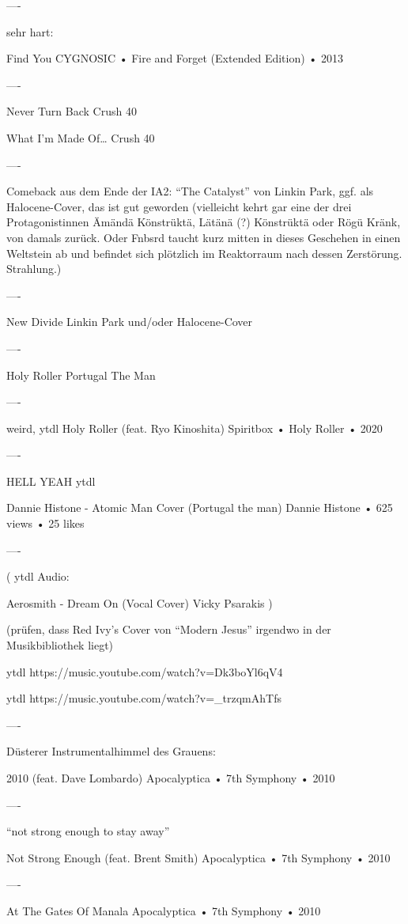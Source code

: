----

sehr hart:

Find You
CYGNOSIC
 •
Fire and Forget (Extended Edition)
 • 2013

----

Never Turn Back
Crush 40

What I'm Made Of…
Crush 40

----

Comeback aus dem Ende der IA2: “The Catalyst” von Linkin Park, ggf. als Halocene-Cover, das ist gut geworden (vielleicht kehrt gar eine der drei Protagonistinnen Ämändä Könstrüktä, Lätänä (?) Könstrüktä oder Rögü Kränk, von damals zurück. Oder Fnbsrd taucht kurz mitten in dieses Geschehen in einen Weltstein ab und befindet sich plötzlich im Reaktorraum nach dessen Zerstörung. Strahlung.)

----

New Divide
Linkin Park
und/oder Halocene-Cover

----

Holy Roller
Portugal The Man

----

weird, ytdl
Holy Roller (feat. Ryo Kinoshita)
Spiritbox
 •
Holy Roller
 •
2020

----

HELL YEAH ytdl

Dannie Histone - Atomic Man Cover (Portugal the man)
Dannie Histone
 •
625 views
 •
25 likes

----

(
ytdl Audio:

Aerosmith - Dream On (Vocal Cover)
Vicky Psarakis
)

(prüfen, dass Red Ivy’s Cover von “Modern Jesus” irgendwo in der Musikbibliothek liegt)

ytdl https://music.youtube.com/watch?v=Dk3boYl6qV4

ytdl https://music.youtube.com/watch?v=_trzqmAhTfs

----

Düsterer Instrumentalhimmel des Grauens:

2010 (feat. Dave Lombardo)
Apocalyptica
 •
7th Symphony
 •
2010

----

“not strong enough to stay away”

Not Strong Enough (feat. Brent Smith)
Apocalyptica
 •
7th Symphony
 •
2010

----

At The Gates Of Manala
Apocalyptica
 •
7th Symphony
 •
2010

